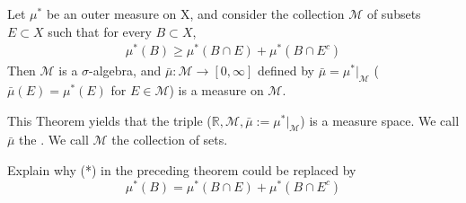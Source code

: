 \documentclass[11pt]{scrartcl}
\begin{document}
\begin{theorem}
Let $\mu^*$ be an outer measure on X, and consider the collection $\mathcal{M}$ of subsets $E \subset X$ such that for every $B \subset X$,
\begin{align}
\mu^*(B) \geq \mu^*(B\cap E) + \mu^*(B \cap E^c)\tag{*}
\end{align}
Then $\mathcal{M}$ is a $\sigma$-algebra, and $\bar{\mu}: \mathcal{M} \rightarrow [0,\infty]$ defined by $\bar{\mu} = \mu^*|_\mathcal{M}$ ($\bar{\mu}(E) = \mu^*(E)$ for $E\in \mathcal{M}$) is a measure on $\mathcal{M}$.
\end{theorem}

\begin{example}
This Theorem yields that the triple ($\mathbb{R},\mathcal{M},\bar{\mu}:=\mu^*|_\mathcal{M} $) is a measure space. We call $\bar{\mu}$ the . We call $\mathcal{M}$ the collection of  sets.
\end{example}

\begin{exercise}
Explain why (*) in the preceding theorem could be replaced by\\
$$\mu^*(B) = \mu^*(B\cap E) + \mu^*(B \cap E^c)$$
\end{exercise}
\end{document}
